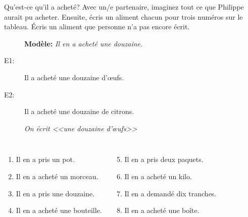 \documentclass{beamer}
\begin{document}
  \begin{frame}{Qu'est-ce qu'il a acheté?}
    Avec un/e partenaire, imaginez tout ce que Philippe aurait pu acheter.
    Ensuite, écris un aliment chacun pour trois numéros sur le tableau. 
    \alert{Écris un aliment que personne n'a pas encore écrit.}\\
    \begin{description}
      \item[] \textbf{Modèle:} \emph{Il en a acheté une douzaine.}
      \item[E1:] Il a acheté une douzaine d'œufs.
      \item[E2:] Il a acheté une douzaine de citrons.
      \item[] \emph{On écrit <<une douzaine d'œufs>>}
    \end{description}
    \begin{columns}
        \begin{enumerate}
          \item Il en a pris un pot.
          \item Il en a acheté un morceau.
          \item Il en a pris une douzaine.
          \item Il en a acheté une bouteille.
        \end{enumerate}
        \begin{enumerate}
          \setcounter{enumi}{4}
          \item Il en a pris deux paquets.
          \item Il en a acheté un kilo.
          \item Il en a demandé dix tranches.
          \item Il en a acheté une boîte.
        \end{enumerate}
    \end{columns}
  \end{frame}
\end{document}
